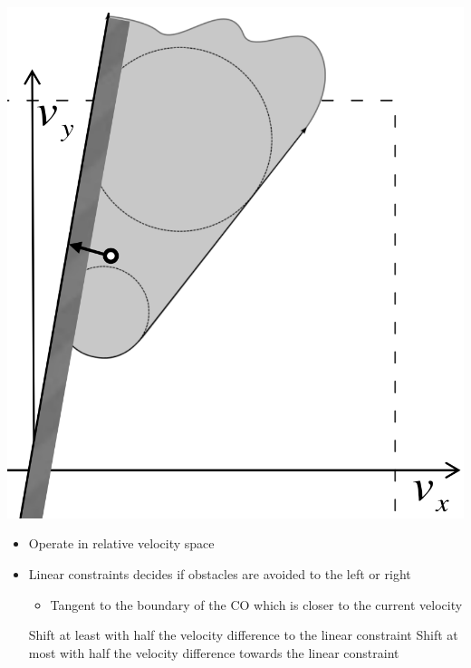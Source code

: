 \begin{itemize}
\begin{minipage}[b]{0.45\linewidth}
            \includegraphics[width=\linewidth]{./Figures/06_RVO.png}
        \end{minipage}
        \begin{itemize}
            \item Operate in relative velocity space
            \item Linear constraints decides if obstacles are avoided to the left or right
                \begin{itemize}
                    \item Tangent to the boundary of the CO which is closer to the current velocity
                \end{itemize}
             Shift at least with half the velocity difference to the linear constraint
             Shift at most with half the velocity difference towards the linear constraint
        \end{itemize}
\end{itemize}

